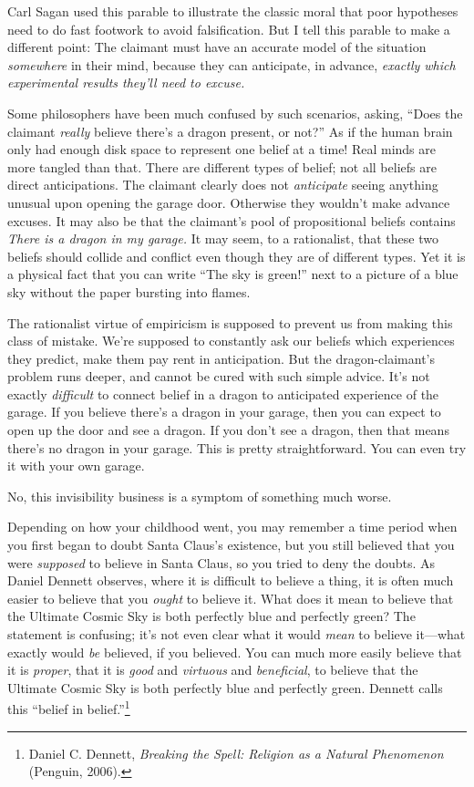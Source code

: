 {
 Carl Sagan used this parable to illustrate the classic moral that
poor hypotheses need to do fast footwork to avoid falsification. But I
tell this parable to make a different point: The claimant must have an
accurate model of the situation \textit{somewhere} in their mind,
because they can anticipate, in advance, \textit{exactly which
experimental results they'll need to excuse.}}

{
 Some philosophers have been much confused by such scenarios,
asking, ``Does the claimant \textit{really} believe
there's a dragon present, or not?''
As if the human brain only had enough disk space to represent one
belief at a time! Real minds are more tangled than that. There are
different types of belief; not all beliefs are direct anticipations.
The claimant clearly does not \textit{anticipate} seeing anything
unusual upon opening the garage door. Otherwise they
wouldn't make advance excuses. It may also be that the
claimant's pool of propositional beliefs contains
\textit{There is a dragon in my garage.} It may seem, to a rationalist,
that these two beliefs should collide and conflict even though they are
of different types. Yet it is a physical fact that you can write
``The sky is green!'' next to a
picture of a blue sky without the paper bursting into flames.}

{
 The rationalist virtue of empiricism is supposed to prevent us
from making this class of mistake. We're supposed to
constantly ask our beliefs which experiences they predict, make them
pay rent in anticipation. But the dragon-claimant's
problem runs deeper, and cannot be cured with such simple advice.
It's not exactly \textit{difficult} to connect belief
in a dragon to anticipated experience of the garage. If you believe
there's a dragon in your garage, then you can expect to
open up the door and see a dragon. If you don't see a
dragon, then that means there's no dragon in your
garage. This is pretty straightforward. You can even try it with your
own garage.}

{
 No, this invisibility business is a symptom of something much
worse.}

{
 Depending on how your childhood went, you may remember a time
period when you first began to doubt Santa Claus's
existence, but you still believed that you were \textit{supposed} to
believe in Santa Claus, so you tried to deny the doubts. As Daniel
Dennett observes, where it is difficult to believe a thing, it is often
much easier to believe that you \textit{ought} to believe it. What does
it mean to believe that the Ultimate Cosmic Sky is both perfectly blue
and perfectly green? The statement is confusing; it's
not even clear what it would \textit{mean} to believe it---what exactly
would \textit{be} believed, if you believed. You can much more easily
believe that it is \textit{proper}, that it is \textit{good} and
\textit{virtuous} and \textit{beneficial}, to believe that the Ultimate
Cosmic Sky is both perfectly blue and perfectly green. Dennett calls
this ``belief in
belief.''\footnote{Daniel C. Dennett, \textit{Breaking the Spell: Religion as a
Natural Phenomenon} (Penguin, 2006).}}

